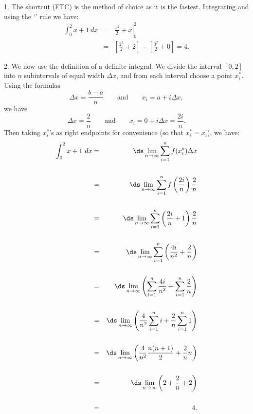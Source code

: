 \begin{solution} 
1. The shortcut (FTC) is the method of choice as it is the fastest.
Integrating and using the `' rule we have:
\begin{eqnarray*}
\int_0^2 x+1~dx&=&\left.\frac{x^2}{2}+x\right|_0^2\\
&=&\left[\frac{2^2}{2}+2\right]-\left[\frac{0^2}{2}+0\right]=4.
\end{eqnarray*}

2. We now use the definition of a definite integral.
We divide the interval $[0,2]$ into $n$ subintervals of equal width $\Delta x$, and from each interval choose a point $x_i^*$.
Using the formulas
$$\Delta x = \frac{b-a}{n}\qquad\mbox{and}\qquad x_i=a+i\Delta x,$$
we have
$$\Delta x = \frac{2}{n}\qquad\mbox{and}\qquad x_i=0+i\Delta x=\frac{2i}{n}.$$
Then taking $x_i^*$'s as right endpoints for convenience (so that $x_i^*=x_i$), we have:
\begin{eqnarray*}
\int_0^2 x+1~dx & = & \ds\lim_{n\to\infty}\sum_{i=1}^n f(x_i^*)\Delta x\\
\\
& = & \ds\lim_{n\to\infty}\sum_{i=1}^n f\left(\frac{2i}{n}\right) \frac{2}{n}\\
\\
& = & \ds\lim_{n\to\infty}\sum_{i=1}^n \left(\frac{2i}{n}+1\right) \frac{2}{n}\\
\\
& = & \ds\lim_{n\to\infty}\sum_{i=1}^n \left(\frac{4i}{n^2}+\frac{2}{n}\right)\\
\\
& = & \ds\lim_{n\to\infty}\left(\sum_{i=1}^n \frac{4i}{n^2}+\sum_{i=1}^n \frac{2}{n} \right)\\
\\
& = & \ds\lim_{n\to\infty}\left(\frac{4}{n^2}\sum_{i=1}^n i+\frac{2}{n}\sum_{i=1}^n 1 \right)\\
\\
& = & \ds\lim_{n\to\infty}\left(\frac{4}{n^2}\frac{n(n+1)}{2}+\frac{2}{n}n \right)\\
\\
& = & \ds\lim_{n\to\infty}\left(2+\frac{2}{n}+2 \right)\\
\\
& = & 4.
\end{eqnarray*}


\end{solution}
